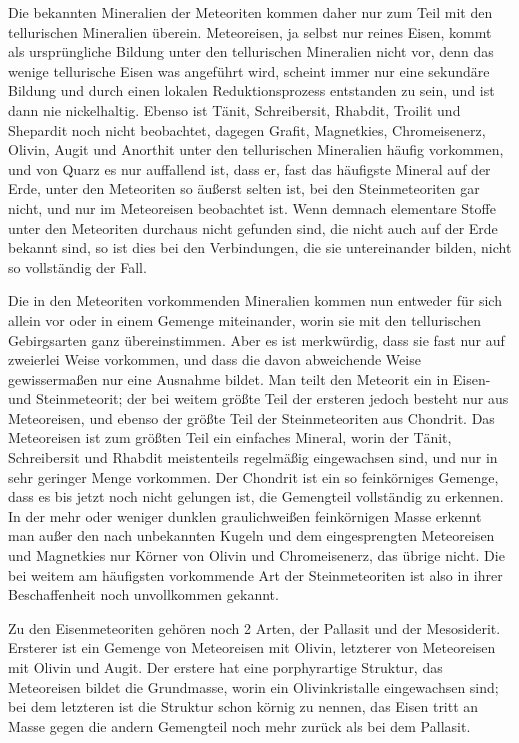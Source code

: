 \documentclass[a4paper, 11pt, oneside]{article}
\begin{document}
Die bekannten Mineralien der Meteoriten kommen daher nur zum Teil mit den tellurischen Mineralien überein. Meteoreisen, ja selbst nur reines Eisen, kommt als ursprüngliche Bildung unter den tellurischen Mineralien nicht vor, denn das wenige tellurische Eisen was angeführt wird, scheint immer nur eine sekundäre Bildung und durch einen lokalen Reduktionsprozess entstanden zu sein, und ist dann nie nickelhaltig. Ebenso ist Tänit, Schreibersit, Rhabdit, Troilit und Shepardit noch nicht beobachtet, dagegen Grafit, Magnetkies, Chromeisenerz, Olivin, Augit und Anorthit unter den tellurischen Mineralien häufig vorkommen, und von Quarz es nur auffallend ist, dass er, fast das häufigste Mineral auf der Erde, unter den Meteoriten so äußerst selten ist, bei den Steinmeteoriten gar nicht, und nur im Meteoreisen beobachtet ist. Wenn demnach elementare Stoffe unter den Meteoriten durchaus nicht gefunden sind, die nicht auch auf der Erde bekannt sind, so ist dies bei den Verbindungen, die sie untereinander bilden, nicht so vollständig der Fall.

Die in den Meteoriten vorkommenden Mineralien kommen nun entweder für sich allein vor oder in einem Gemenge miteinander, worin sie mit den tellurischen Gebirgsarten ganz übereinstimmen. Aber es ist merkwürdig, dass sie fast nur auf zweierlei Weise vorkommen, und dass die davon abweichende Weise gewissermaßen nur eine Ausnahme bildet. Man teilt den Meteorit ein in Eisen- und Steinmeteorit; der bei weitem größte Teil der ersteren jedoch besteht nur aus Meteoreisen, und ebenso der größte Teil der Steinmeteoriten aus Chondrit. Das Meteoreisen ist zum größten Teil ein einfaches Mineral, worin der Tänit, Schreibersit und Rhabdit meistenteils regelmäßig eingewachsen sind, und nur in sehr geringer Menge vorkommen. Der Chondrit ist ein so feinkörniges Gemenge, dass es bis jetzt noch nicht gelungen ist, die Gemengteil vollständig zu erkennen. In der mehr oder weniger dunklen graulichweißen feinkörnigen Masse erkennt man außer den nach unbekannten Kugeln und dem eingesprengten Meteoreisen und Magnetkies nur Körner von Olivin und Chromeisenerz, das übrige nicht. Die bei weitem am häufigsten vorkommende Art der Steinmeteoriten ist also in ihrer Beschaffenheit noch unvollkommen gekannt.

Zu den Eisenmeteoriten gehören noch 2 Arten, der Pallasit und der Mesosiderit. Ersterer ist ein Gemenge von Meteoreisen mit Olivin, letzterer von Meteoreisen mit Olivin und Augit. Der erstere hat eine porphyrartige Struktur, das Meteoreisen bildet die Grundmasse, worin ein Olivinkristalle eingewachsen sind; bei dem letzteren ist die Struktur schon körnig zu nennen, das Eisen tritt an Masse gegen die andern Gemengteil noch mehr zurück als bei dem Pallasit.
\end{document}
